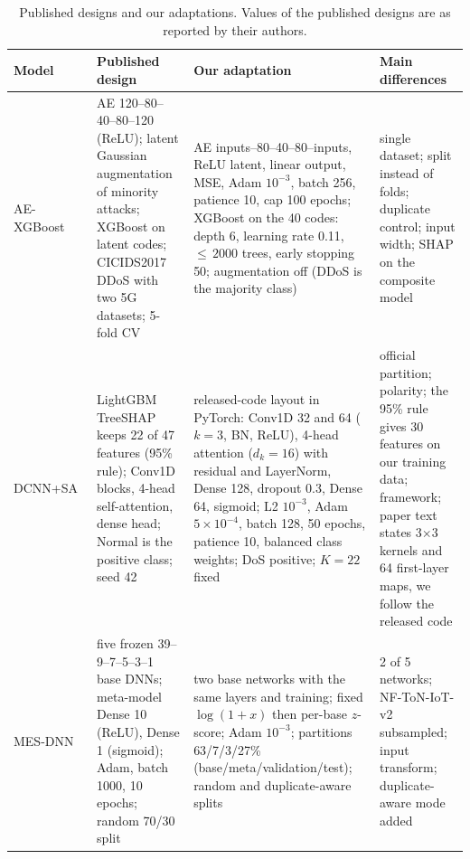 \documentclass[journal]{IEEEtran}
\begin{document}
\begin{table}[!t]
\centering
\caption{\upshape Published designs and our adaptations. Values of the published designs are as reported
by their authors.}
\label{tab:arch}
\footnotesize\renewcommand{\arraystretch}{1.18}
\begin{tabular}{@{}L{2.2cm}L{4.9cm}L{5.4cm}L{4.3cm}@{}}
\toprule
Model & Published design & Our adaptation & Main differences \\
\midrule
AE-XGBoost~\cite{nezhadsistani2026} & AE 120--80--40--80--120 (ReLU); latent Gaussian augmentation of minority attacks; XGBoost on latent codes; CICIDS2017 DDoS with two 5G datasets; 5-fold CV & AE inputs--80--40--80--inputs, ReLU latent, linear output, MSE, Adam $10^{-3}$, batch 256, patience 10, cap 100 epochs; XGBoost on the 40 codes: depth 6, learning rate 0.11, ${\le}\,2000$ trees, early stopping 50; augmentation off (DDoS is the majority class) & single dataset; split instead of folds; duplicate control; input width; SHAP on the composite model \\
DCNN+SA~\cite{fang2026} & LightGBM TreeSHAP keeps 22 of 47 features (95\% rule); Conv1D blocks, 4-head self-attention, dense head; Normal is the positive class; seed 42 & released-code layout in PyTorch: Conv1D 32 and 64 ($k=3$, BN, ReLU), 4-head attention ($d_k=16$) with residual and LayerNorm, Dense 128, dropout 0.3, Dense 64, sigmoid; L2 $10^{-3}$, Adam $5\times10^{-4}$, batch 128, 50 epochs, patience 10, balanced class weights; DoS positive; $K=22$ fixed & official partition; polarity; the 95\% rule gives 30 features on our training data; framework; paper text states 3$\times$3 kernels and 64 first-layer maps, we follow the released code \\
MES-DNN~\cite{wardana2026} & five frozen 39--9--7--5--3--1 base DNNs; meta-model Dense 10 (ReLU), Dense 1 (sigmoid); Adam, batch 1000, 10 epochs; random 70/30 split & two base networks with the same layers and training; fixed $\log(1+x)$ then per-base $z$-score; Adam $10^{-3}$; partitions 63/7/3/27\% (base/meta/validation/test); random and duplicate-aware splits & 2 of 5 networks; NF-ToN-IoT-v2 subsampled; input transform; duplicate-aware mode added \\
\bottomrule
\end{tabular}
\end{table}

\end{document}
